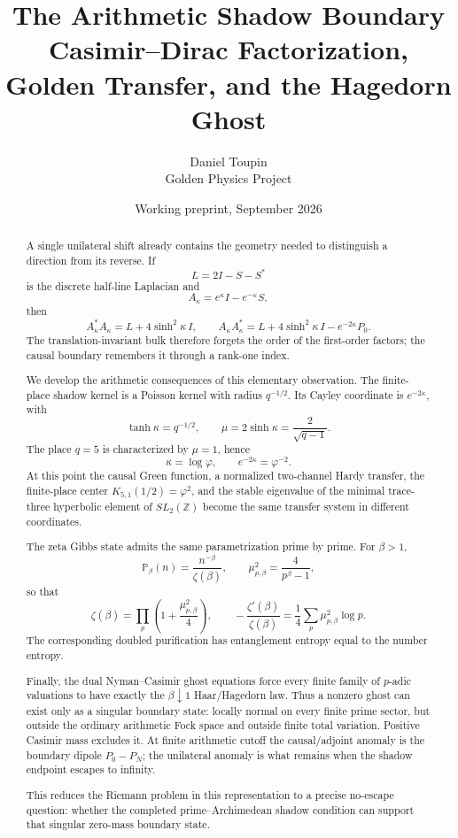 \documentclass[11pt]{article}
\title{\textbf{The Arithmetic Shadow Boundary}\\[3pt]
\large Casimir--Dirac Factorization, Golden Transfer, and the Hagedorn Ghost}
\author{Daniel Toupin\\
Golden Physics Project}
\date{Working preprint, September 2026}
\theoremstyle{definition}
\theoremstyle{remark}
\begin{document}
\maketitle

\begin{abstract}
A single unilateral shift already contains the geometry needed to distinguish a direction from its reverse.  If
\[
L=2I-S-S^*
\]
is the discrete half-line Laplacian and
\[
A_\kappa=e^\kappa I-e^{-\kappa}S,
\]
then
\[
A_\kappa^*A_\kappa=L+4\sinh^2\kappa\,I,
\qquad
A_\kappa A_\kappa^*
=L+4\sinh^2\kappa\,I-e^{-2\kappa}P_0.
\]
The translation-invariant bulk therefore forgets the order of the first-order factors; the causal boundary remembers it through a rank-one index.

We develop the arithmetic consequences of this elementary observation.  The finite-place shadow kernel is a Poisson kernel with radius \(q^{-1/2}\).  Its Cayley coordinate is \(e^{-2\kappa}\), with
\[
\tanh\kappa=q^{-1/2},
\qquad
\mu=2\sinh\kappa=\frac{2}{\sqrt{q-1}}.
\]
The place \(q=5\) is characterized by \(\mu=1\), hence
\[
\kappa=\log\varphi,\qquad e^{-2\kappa}=\varphi^{-2}.
\]
At this point the causal Green function, a normalized two-channel Hardy transfer, the finite-place center \(K_{5,1}(1/2)=\varphi^2\), and the stable eigenvalue of the minimal trace-three hyperbolic element of \(SL_2(\mathbb Z)\) become the same transfer system in different coordinates.

The zeta Gibbs state admits the same parametrization prime by prime.  For \(\beta>1\),
\[
\mathbb P_\beta(n)=\frac{n^{-\beta}}{\zeta(\beta)},
\qquad
\mu_{p,\beta}^2=\frac{4}{p^\beta-1},
\]
so that
\[
\zeta(\beta)=\prod_p\left(1+\frac{\mu_{p,\beta}^2}{4}\right),
\qquad
-\frac{\zeta'(\beta)}{\zeta(\beta)}
=\frac14\sum_p\mu_{p,\beta}^2\log p.
\]
The corresponding doubled purification has entanglement entropy equal to the number entropy.

Finally, the dual Nyman--Casimir ghost equations force every finite family of \(p\)-adic valuations to have exactly the \(\beta\downarrow1\) Haar/Hagedorn law.  Thus a nonzero ghost can exist only as a singular boundary state: locally normal on every finite prime sector, but outside the ordinary arithmetic Fock space and outside finite total variation.  Positive Casimir mass excludes it.  At finite arithmetic cutoff the causal/adjoint anomaly is the boundary dipole \(P_0-P_N\); the unilateral anomaly is what remains when the shadow endpoint escapes to infinity.

This reduces the Riemann problem in this representation to a precise no-escape question: whether the completed prime--Archimedean shadow condition can support that singular zero-mass boundary state.
\end{abstract}
\end{document}
